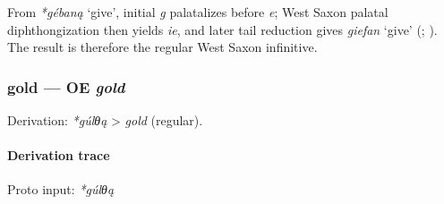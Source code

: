 \documentclass[
  british,
  a4paper,
]{article}
\providecommand{\Recon}[1]{\emph{*#1}}
\begin{document}
From \Recon{gébaną} `give', initial \emph{g} palatalizes before
\emph{e}; West Saxon palatal diphthongization then yields \emph{ie}, and
later tail reduction gives {\emph{giefan}} `give'
(;
). The result is
therefore the regular West Saxon infinitive.

\subsubsection{\texorpdfstring{gold --- OE
\emph{gold}}{gold --- OE gold}}\label{gold-oe-gold}

Derivation: \emph{*gúlθą} \textgreater{} \emph{gold} (regular).

\paragraph{Derivation trace}\label{derivation-trace-27}

Proto input: \emph{*gúlθą}

\begingroup
\setlength{\fboxsep}{6pt}
\end{document}
